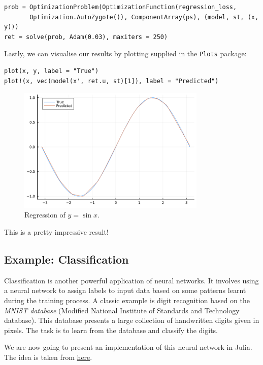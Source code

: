 \documentclass[a4paper,11pt, titlepage]{article}
\theoremstyle{definition}
\theoremstyle{plain}
\theoremstyle{remark}
\begin{document}
\begin{verbatim}
prob = OptimizationProblem(OptimizationFunction(regression_loss,
       Optimization.AutoZygote()), ComponentArray(ps), (model, st, (x, y)))
ret = solve(prob, Adam(0.03), maxiters = 250)
\end{verbatim}

Lastly, we can visualise our results by plotting supplied in the \verb|Plots| package:

\begin{verbatim}
plot(x, y, label = "True")
plot!(x, vec(model(x', ret.u, st)[1]), label = "Predicted")
\end{verbatim}

\begin{figure}[htbp]
    \centering
    \includegraphics[width=0.8\textwidth]{figures/Regression.png}
    \caption{Regression of $y = \sin x$.}
\end{figure}

This is a pretty impressive result!

\subsection{Example: Classification}

Classification is another powerful application of neural networks. It involves using a neural network to assign labels to input data based on some patterns learnt during the training process. A classic example is digit recognition based on the \textit{MNIST database} (Modified National Institute of Standards and Technology database). This database presents a large collection of handwritten digits given in pixels. The task is to learn from the database and classify the digits.

We are now going to present an implementation of this neural network in Julia. The idea is taken from \href{https://github.com/piotrek124-1/Simple_MNIST_Julia/tree/main}{here}.
\end{document}

